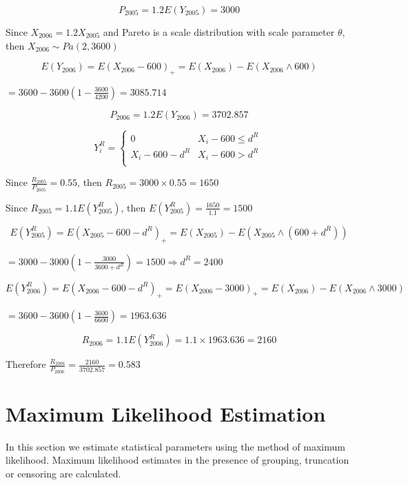 \documentclass[]{book}
\theoremstyle{definition}
\theoremstyle{definition}
\theoremstyle{definition}
\theoremstyle{remark}
\begin{document}
\[P_{2005} = 1.2E\left( Y_{2005} \right) = 3000\]

Since \(X_{2006} = 1.2X_{2005}\) and Pareto is a scale distribution with
scale parameter \(\theta\), then
\(X_{2006}\sim Pa\left( 2,3600 \right)\)

\[E\left( Y_{2006} \right) = E\left( X_{2006} - 600 \right)_{+} = E\left( X_{2006} \right) - E\left( X_{2006} \land 600 \right)\]

\(= 3600 - 3600\left( 1 - \frac{3600}{4200} \right) = 3085.714\)

\[P_{2006} = 1.2E\left( Y_{2006} \right) = 3702.857\]

\[Y_{i}^{R} = \left\{ \begin{matrix}
0 & X_{i} - 600 \leq d^{R} \\
X_{i} - 600 - d^{R} & X_{i} - 600 > d^{R} \\
\end{matrix} \right.\ \]

Since \(\frac{R_{2005}}{P_{2005}} = 0.55\), then
\(R_{2005} = 3000 \times 0.55 = 1650\)

Since \(R_{2005} = 1.1E\left( Y_{2005}^{R} \right)\), then
\(E\left( Y_{2005}^{R} \right) = \frac{1650}{1.1} = 1500\)

\[E\left( Y_{2005}^{R} \right) = E\left( X_{2005} - 600 - d^{R} \right)_{+} = E\left( X_{2005} \right) - E\left( X_{2005} \land \left( 600 + d^{R} \right) \right)\]

\(= 3000 - 3000\left( 1 - \frac{3000}{3600 + d^{R}} \right) = 1500 \Rightarrow d^{R} = 2400\)

\[E\left( Y_{2006}^{R} \right) = E\left( X_{2006} - 600 - d^{R} \right)_{+} = E\left( X_{2006} - 3000 \right)_{+} = E\left( X_{2006} \right) - E\left( X_{2006} \land 3000 \right)\]

\(= 3600 - 3600\left( 1 - \frac{3600}{6600} \right) = 1963.636\)

\[R_{2006} = 1.1E\left( Y_{2006}^{R} \right) = 1.1 \times 1963.636 = 2160\]

Therefore \(\frac{R_{2006}}{P_{2006}} = \frac{2160}{3702.857} = 0.583\)

\section{Maximum Likelihood
Estimation}\label{maximum-likelihood-estimation}

In this section we estimate statistical parameters using the method of
maximum likelihood. Maximum likelihood estimates in the presence of
grouping, truncation or censoring are calculated.
\end{document}
